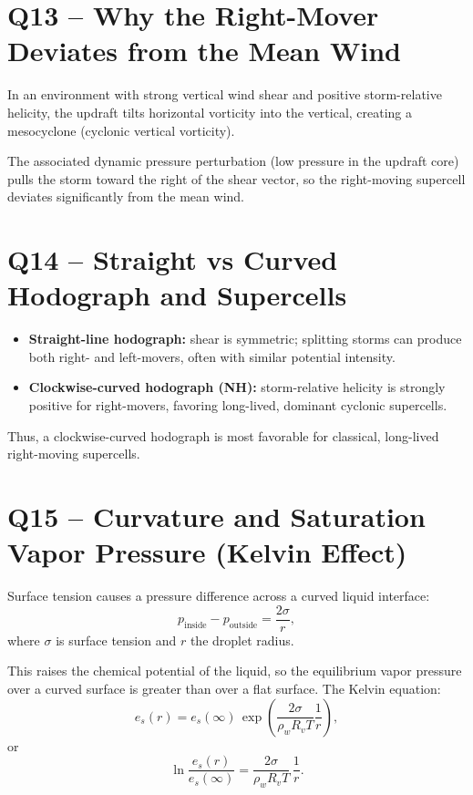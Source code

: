 \documentclass[12pt,a4paper]{article}
\begin{document}
\section*{Q13 -- Why the Right-Mover Deviates from the Mean Wind}

In an environment with strong vertical wind shear and positive
storm-relative helicity, the updraft tilts horizontal vorticity
into the vertical, creating a mesocyclone (cyclonic vertical vorticity).

The associated dynamic pressure perturbation (low pressure in the
updraft core) pulls the storm toward the right of the shear vector,
so the right-moving supercell deviates significantly from the
mean wind.

\section*{Q14 -- Straight vs Curved Hodograph and Supercells}

\begin{itemize}
  \item \textbf{Straight-line hodograph:} shear is symmetric; splitting storms
        can produce both right- and left-movers, often with similar potential
        intensity.
  \item \textbf{Clockwise-curved hodograph (NH):} storm-relative helicity is
        strongly positive for right-movers, favoring long-lived, dominant
        cyclonic supercells.
\end{itemize}

Thus, a clockwise-curved hodograph is most favorable for
classical, long-lived right-moving supercells.

\section*{Q15 -- Curvature and Saturation Vapor Pressure (Kelvin Effect)}

Surface tension causes a pressure difference across a curved
liquid interface:
\[
p_\text{inside} - p_\text{outside} = \frac{2\sigma}{r},
\]
where \(\sigma\) is surface tension and \(r\) the droplet radius.

This raises the chemical potential of the liquid, so
the equilibrium vapor pressure over a curved surface
is greater than over a flat surface. The Kelvin equation:
\[
e_s(r) = e_s(\infty)\,
\exp\left(\frac{2\sigma}{\rho_w R_v T}\frac{1}{r}\right),
\]
or
\[
\ln\frac{e_s(r)}{e_s(\infty)}
= \frac{2\sigma}{\rho_w R_v T}\,\frac{1}{r}.
\]
\end{document}
